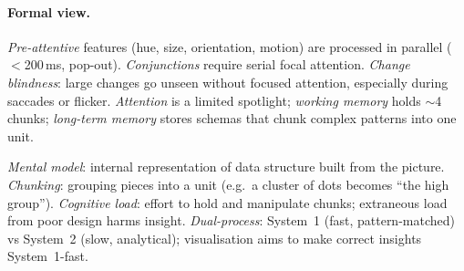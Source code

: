 \paragraph{Formal view.} \emph{Pre-attentive} features (hue, size, orientation, motion) are processed in parallel ($<$200\,ms, pop-out). \emph{Conjunctions} require serial focal attention. \emph{Change blindness}: large changes go unseen without focused attention, especially during saccades or flicker. \emph{Attention} is a limited spotlight; \emph{working memory} holds $\sim$4 chunks; \emph{long-term memory} stores schemas that chunk complex patterns into one unit.

\begin{definition}\label{def:cognitive}
\emph{Mental model}: internal representation of data structure built from the picture. \emph{Chunking}: grouping pieces into a unit (e.g.\ a cluster of dots becomes ``the high group''). \emph{Cognitive load}: effort to hold and manipulate chunks; extraneous load from poor design harms insight. \emph{Dual-process}: System~1 (fast, pattern-matched) vs System~2 (slow, analytical); visualisation aims to make correct insights System~1-fast.
\end{definition}

